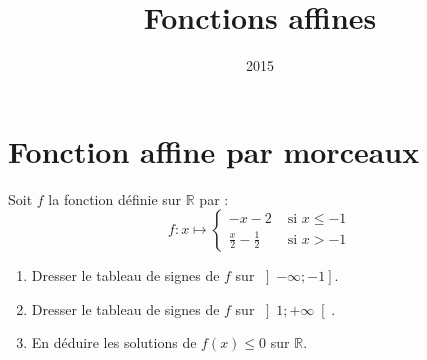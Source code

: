 \documentclass[14pt, aspectratio=34]{beamer}
\institute{Lycée Marie Curie}
\date{2015}
\title{Fonctions affines}
\begin{document}
\section{Fonction affine par morceaux}
\begin{frame}
  Soit $f$ la fonction définie sur $\mathbb{R}$ par :
  \[
    f:x\mapsto\left\{
    \begin{array}{cl}
    -x-2 & \text{ si $x\leq -1$} \\
    \frac{x}{2}-\frac{1}{2} & \text{ si $x>-1$}
    \end{array}
    \right.
  \]
  \begin{enumerate}
    \item Dresser le tableau de signes de $f$ sur $\left] -\infty;-1 \right]$.
    \item Dresser le tableau de signes de $f$ sur $\left] 1;+\infty \right[$.
      \item En déduire les solutions de $f(x)\leq0$ sur $\mathbb{R}$.
  \end{enumerate}
\end{frame}
\end{document}
